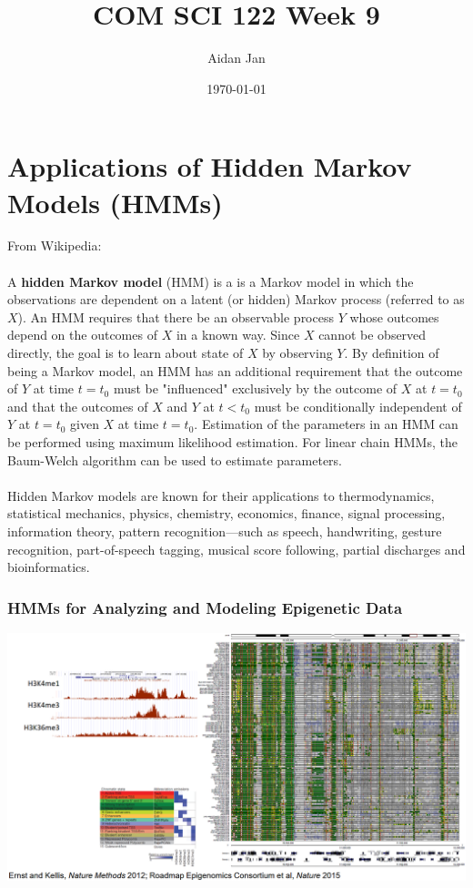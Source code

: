 \documentclass[10pt]{article}
\title{COM SCI 122 Week 9}
\author{Aidan Jan}
\date{\today}
\begin{document}
\maketitle

\section*{Applications of Hidden Markov Models (HMMs)}
From Wikipedia:\\\\
A \textbf{hidden Markov model} (HMM) is a is a Markov model in which the observations are dependent on a latent (or hidden) Markov process (referred to as $X$). An HMM requires that there be an observable process $Y$ whose outcomes depend on the outcomes of $X$ in a known way. Since $X$ cannot be observed directly, the goal is to learn about state of $X$ by observing $Y$. By definition of being a Markov model, an HMM has an additional requirement that the outcome of $Y$ at time $t = t_0$ must be "influenced" exclusively by the outcome of $X$ at $t = t_0$ and that the outcomes of $X$ and $Y$ at $t < t_0$ must be conditionally independent of $Y$ at $t = t_0$ given $X$ at time $t = t_0$. Estimation of the parameters in an HMM can be performed using maximum likelihood estimation. For linear chain HMMs, the Baum-Welch algorithm can be used to estimate parameters.\\\\
Hidden Markov models are known for their applications to thermodynamics, statistical mechanics, physics, chemistry, economics, finance, signal processing, information theory, pattern recognition—such as speech, handwriting, gesture recognition, part-of-speech tagging, musical score following, partial discharges and bioinformatics.

\subsubsection*{HMMs for Analyzing and Modeling Epigenetic Data}
\begin{center} 
	\includegraphics*[width=\textwidth]{W9_1.png} 
\end{center}
\end{document}

